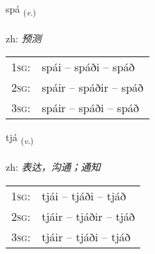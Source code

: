\documentclass[frontgrid, backgrid]{flacards}\usepackage[]{graphicx}\usepackage[]{color}
\begin{document}
\renewcommand{\flhead}{\vskip5pt \fboxsep=0pt {\small\bfseries\footnotesize Sagnorð | 动词}}
\renewcommand{\fcfoot}{\vskip5pt \fboxsep=0pt \hspace{2pt}{\small\bfseries\footnotesize 2K}}

\renewcommand{\blhead}{\vskip5pt {\small\bfseries\footnotesize Sagnorð | 动词 }}
\renewcommand{\bcfoot}{\vskip5pt \hspace{2pt}{\small\bfseries\footnotesize 2K}}


{spá \small{\textsubscript{(\textit{v.})}} \\[1ex] %
\textphonetic{[spauː]} \\
zh: \emph{预测} \\  [2ex]
\renewcommand*{\arraystretch}{0.8}
\begin{tabular}{p{1cm}l}
\textsc{1sg}: & spái -- spáði -- spáð \\ 
\textsc{2sg}: & spáir -- spáðir -- spáð \\ 
\textsc{3sg}: & spáir -- spáði -- spáð \\ 
\end{tabular}
}

\renewcommand{\flhead}{\vskip5pt \fboxsep=0pt {\small\bfseries\footnotesize Sagnorð | 动词}}
\renewcommand{\fcfoot}{\vskip5pt \fboxsep=0pt \hspace{2pt}{\small\bfseries\footnotesize 2K}}

\renewcommand{\blhead}{\vskip5pt {\small\bfseries\footnotesize Sagnorð | 动词 }}
\renewcommand{\bcfoot}{\vskip5pt \hspace{2pt}{\small\bfseries\footnotesize 2K}}


{tjá \small{\textsubscript{(\textit{v.})}} \\[1ex] %
\textphonetic{[tʰjauː]} \\
zh: \emph{表达，沟通；通知} \\  [2ex]
\renewcommand*{\arraystretch}{0.8}
\begin{tabular}{p{1cm}l}
\textsc{1sg}: & tjái -- tjáði -- tjáð \\ 
\textsc{2sg}: & tjáir -- tjáðir -- tjáð \\ 
\textsc{3sg}: & tjáir -- tjáði -- tjáð \\ 
\end{tabular}
}
\end{document}

